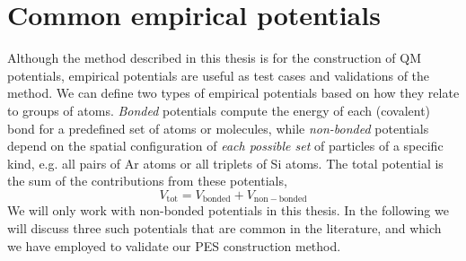 \documentclass[twoside,english]{uiofysmaster}
\begin{document}
\section{Common empirical potentials}
Although the method described in this thesis is for the construction of QM potentials, empirical potentials
are useful as test cases and validations of the method. We can define two types of empirical potentials based on how they 
relate to groups of atoms. \textit{Bonded} potentials compute the energy of each (covalent) bond for a predefined set 
of atoms or molecules, while \textit{non-bonded} potentials depend on the spatial configuration of \textit{each possible set}
of particles of a specific kind, e.g. all pairs of Ar atoms or all triplets of Si atoms. The total potential 
is the sum of the contributions from these potentials,
\begin{equation}
 V_{\mathrm{tot}} = V_{\mathrm{bonded}} + V_{\mathrm{non-bonded}}
\end{equation}
We will only work with non-bonded potentials in this thesis. In the following we will discuss three such potentials
that are common in the literature, and which we have employed to validate our PES construction method. 
\end{document}
